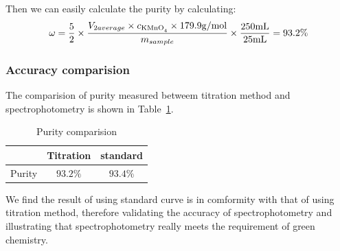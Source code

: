 Then we can easily calculate the purity by calculating: \[\omega=\frac{5}{2}\times\frac{V_{2average}\times c_{\ce{KMnO4}}\times179.9{\rm g/mol}}{m_{sample}}\times\frac{250{\rm mL}}{25{\rm mL}}=93.2\%\]


\subsubsection{Accuracy comparision}
The comparision of purity measured betweem titration method and spectrophotometry is shown in Table~\ref{tab.Res}.

\begin{table}[H]
	\caption{Purity comparision}
	\label{tab.Res}
	\begin{tabular}{ccc}
	\toprule
		   & Titration & standard\\
	\midrule
	Purity & $93.2\%$  & $93.4\%$\\
	\bottomrule
	\end{tabular}
\end{table}

We find the result of using standard curve is in comformity with that of using titration method, therefore validating the accuracy of spectrophotometry and illustrating that spectrophotometry really meets the requirement of green chemistry.

\ifx\SUM\undefined


\fi